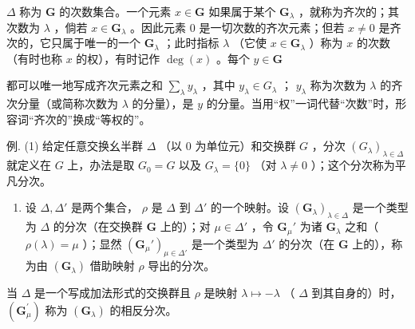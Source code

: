 \(\Delta\) 称为 \(\mathbf{G}\) 的次数集合。一个元素 \(x \in \mathbf{G}\) 如果属于某个 \(\mathbf{G}_{\lambda}\) ，就称为齐次的；其次数为 \(\lambda\) ，倘若 \(x \in \mathbf{G}_{\lambda}\) 。因此元素 0 是一切次数的齐次元素；但若 \(x \neq 0\) 是齐次的，它只属于唯一的一个 \(\mathbf{G}_{\lambda}\) ；此时指标 \(\lambda\) （它使 \(x \in \mathbf{G}_{\lambda}\) ）称为 \(x\) 的次数（有时也称 \(x\) 的权），有时记作 \(\deg(x)\) 。每个 \(y \in \mathbf{G}\)

都可以唯一地写成齐次元素之和 \(\sum_{\lambda} y_{\lambda}\) ，其中 \(y_{\lambda} \in G_{\lambda}\) ； \(y_{\lambda}\) 称为次数为 \(\lambda\) 的齐次分量（或简称次数为 \(\lambda\) 的分量），是 \(y\) 的分量。当用“权”一词代替“次数”时，形容词“齐次的”换成“等权的”。

例. (1) 给定任意交换幺半群 \(\Delta\) （以 0 为单位元）和交换群 \(G\) ，分次 \((G_{\lambda})_{\lambda \in \Delta}\) 就定义在 \(G\) 上，办法是取 \(G_0 = G\) 以及 \(G_{\lambda} = \{0\}\) （对 \(\lambda \neq 0\) ）；这个分次称为平凡分次。

\begin{enumerate}
\def\labelenumi{(\arabic{enumi})}
\setcounter{enumi}{1}
\tightlist
\item
  设 \(\Delta, \Delta'\) 是两个集合， \(\rho\) 是 \(\Delta\) 到 \(\Delta'\) 的一个映射。设 \((\mathbf{G}_{\lambda})_{\lambda \in \Delta}\) 是一个类型为 \(\Delta\) 的分次（在交换群 \(\mathbf{G}\) 上的）；对 \(\mu \in \Delta'\) ，令 \(\mathbf{G}_{\mu}'\) 为诸 \(\mathbf{G}_{\lambda}\) 之和（ \(\rho(\lambda) = \mu\) ）；显然 \((\mathbf{G}_{\mu}')_{\mu \in \Delta'}\) 是一个类型为 \(\Delta'\) 的分次（在 \(\mathbf{G}\) 上的），称为由 \((\mathbf{G}_{\lambda})\) 借助映射 \(\rho\) 导出的分次。
\end{enumerate}

当 \(\Delta\) 是一个写成加法形式的交换群且 \(\rho\) 是映射 \(\lambda \mapsto -\lambda\) （ \(\Delta\) 到其自身的）时， \((\mathbf{G}_{\mu}^{\prime})\) 称为 \((\mathbf{G}_{\lambda})\) 的相反分次。

